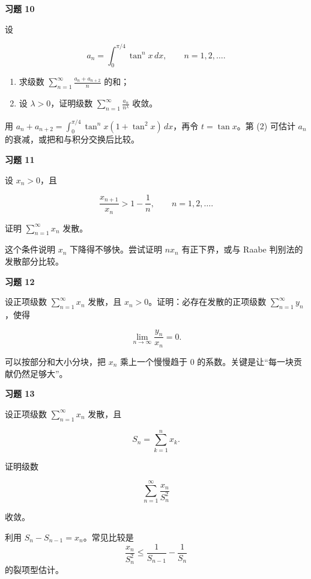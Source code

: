 \begin{exercisebox}
\textbf{习题 10 }

设

\[
      a_n=\int_0^{\pi/4}\tan^n x\,dx,\qquad n=1,2,\ldots.
      \]

\begin{enumerate}
 \item 求级数 \(\sum_{n=1}^{\infty}\frac{a_n+a_{n+2}}{n}\) 的和；
 \item 设 \(\lambda>0\)，证明级数 \(\sum_{n=1}^{\infty}\frac{a_n}{n^\lambda}\) 收敛。
 \end{enumerate}

\begin{hintbox}
用 \(a_n+a_{n+2}=\int_0^{\pi/4}\tan^n x(1+\tan^2x)\,dx\)，再令 \(t=\tan x\)。第 (2) 可估计 \(a_n\) 的衰减，或把和与积分交换后比较。
\end{hintbox}
\end{exercisebox}

\begin{exercisebox}
\textbf{习题 11 }

设 \(x_n>0\)，且

\[
      \frac{x_{n+1}}{x_n}>1-\frac1n,\qquad n=1,2,\ldots.
      \]

证明 \(\sum_{n=1}^{\infty}x_n\) 发散。

\begin{hintbox}
这个条件说明 \(x_n\) 下降得不够快。尝试证明 \(n x_n\) 有正下界，或与 Raabe 判别法的发散部分比较。
\end{hintbox}
\end{exercisebox}

\begin{exercisebox}
\textbf{习题 12 }

设正项级数 \(\sum_{n=1}^{\infty}x_n\) 发散，且 \(x_n>0\)。证明：必存在发散的正项级数 \(\sum_{n=1}^{\infty}y_n\)，使得

\[
      \lim_{n\to\infty}\frac{y_n}{x_n}=0.
      \]

\begin{hintbox}
可以按部分和大小分块，把 \(x_n\) 乘上一个慢慢趋于 \(0\) 的系数。关键是让“每一块贡献仍然足够大”。
\end{hintbox}
\end{exercisebox}

\begin{exercisebox}
\textbf{习题 13 }

设正项级数 \(\sum_{n=1}^{\infty}x_n\) 发散，且

\[
      S_n=\sum_{k=1}^{n}x_k.
      \]

证明级数

\[
      \sum_{n=1}^{\infty}\frac{x_n}{S_n^2}
      \]

收敛。

\begin{hintbox}
利用 \(S_n-S_{n-1}=x_n\)。常见比较是 \[
        \frac{x_n}{S_n^2}
        \le
        \frac1{S_{n-1}}-\frac1{S_n}
        \] 的裂项型估计。
\end{hintbox}
\end{exercisebox}


